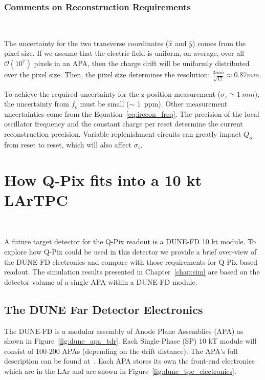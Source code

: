 \subsubsection{Comments on Reconstruction Requirements}~\label{sec:recon_uncert}

The uncertainty for the two transverse coordinates ($\hat{x}$ and $\hat{y}$) comes from the pixel size.
If we assume that the electric field is uniform, on average, over all $\mathcal{O}(10^{7})$ pixels in an APA, then the charge drift will be uniformly distributed over the pixel size.
Then, the pixel size determines the resolution: $\frac{3 mm}{\sqrt{12}} \approx 0.87 mm$.

To achieve the required uncertainty for the z-position measurement ($\sigma_{z} \simeq 1~\unit{mm}$), the uncertainty from $f_{o}$ must be small ($\sim$ 1~\unit{ppm}).
Other measurement uncertainties come from the Equation~\ref{eq:irecon_freq}.
The precision of the local oscillator frequency and the constant charge per reset determine the current reconstruction precision.
Variable replenishment circuits can greatly impact $Q_{o}$ from reset to reset, which will also affect $\sigma_{z}$.

\section{How Q-Pix fits into a 10 kt LArTPC}~\label{sec:qpix_apa}

A future target detector for the Q-Pix readout is a DUNE-FD 10 kt module.
To explore how Q-Pix could be used in this detector we provide a brief over-view of the DUNE-FD electronics and compare with those requirements for Q-Pix based readout.
The simulation results presented in Chapter~\ref{chap:sim} are based on the detector volume of a single APA within a DUNE-FD module.

\subsection{The DUNE Far Detector Electronics}

The DUNE-FD is a modular assembly of Anode Plane Assemblies (APA) as shown in Figure~\ref{fig:dune_apa_tdr}.
Each Single-Phase (SP) 10 kT module will consist of 100-200 APAs (depending on the drift distance).
The APA's full description can be found at~\citep{DUNE-FD_TDRv4:Abi_2020}.
Each APA stores its own the front-end electronics which are in the LAr and are shown in Figure~\ref{fig:dune_tpc_electronics}.


